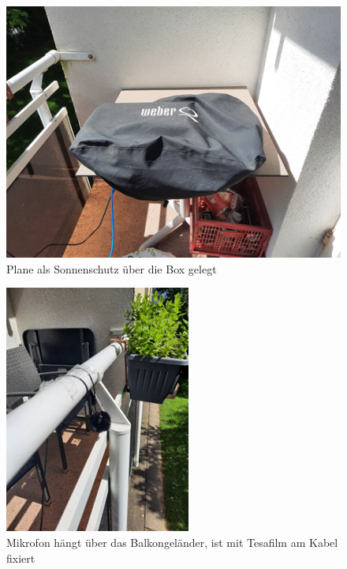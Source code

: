 \begin{figure}
    \centering
    \includegraphics[width=1\linewidth]{bilder/balkon_02.png}
    \caption{Plane als Sonnenschutz über die Box gelegt}
    \label{fig:enter-label}
\end{figure}

\begin{figure}
    \centering
    \includegraphics[width=1\linewidth]{bilder/balkon_03.png}
    \caption{Mikrofon hängt über das Balkongeländer, ist mit Tesafilm am Kabel fixiert}
    \label{fig:enter-label}
\end{figure}

